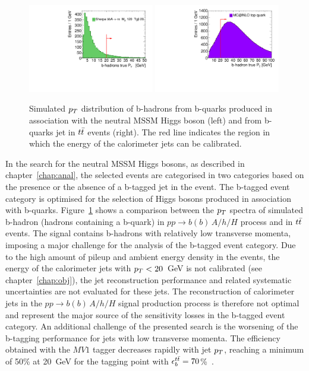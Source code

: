 \begin{figure}[tp]
     \begin{center}

            \includegraphics[width=0.49\textwidth]{figure/trackjet/b_pt_distro2.pdf}
            \includegraphics[width=0.49\textwidth]{figure/trackjet/top_pt_distro.pdf}

    \end{center}
    \caption{Simulated $p_{T}$ distribution of b-hadrons from b-quarks produced in association with the neutral MSSM Higgs boson 
	(left) 	and from b-quarks jet in  $t\bar{t}$ events (right). 
	The red line indicates the region in which the energy of the calorimeter jets can be calibrated.}
   \label{fig:bjetDistro}
\end{figure}


In the search for the neutral MSSM Higgs bosons, as described in chapter~\ref{chap:anal}, the selected events are categorised 
in two categories based on the presence or the absence of a b-tagged jet in the event. The b-tagged event category 
is optimised for the selection of Higgs bosons produced in association with b-quarks. Figure~\ref{fig:bjetDistro} shows a comparison 
between the $p_{T}$ spectra of simulated b-hadron (hadrons containing a b-quark) in $pp\rightarrow b(b)\,A/h/H$ process  and in $t\bar{t}$ events.
The signal contains  b-hadrons with relatively low transverse momenta, imposing a  major challenge 
for the analysis of the b-tagged event category. Due to the high amount of pileup and ambient energy density in the events, 
the energy of the calorimeter jets with $p_{T}<20$~GeV is not calibrated (see chapter~\ref{chap:obj}), the jet reconstruction performance 
and related systematic uncertainties are not evaluated for these jets. The reconstruction of calorimeter jets in the $pp\rightarrow b(b)\,A/h/H$ 
signal production process is therefore not optimal and represent the major source of the sensitivity losses 
in the b-tagged event category.
An additional challenge of the presented search is the worsening of the  b-tagging performance for jets with low transverse momenta. 
The efficiency obtained with the $MV1$ tagger decreases  rapidly  with jet $p_{T}$, reaching a minimum of 50\% at 
20~GeV for the tagging point with $\epsilon_b^{t\bar{t}}=70$\%~\cite{BtaggingScaleFactors,BtaggingScaleFactorsNew}.

